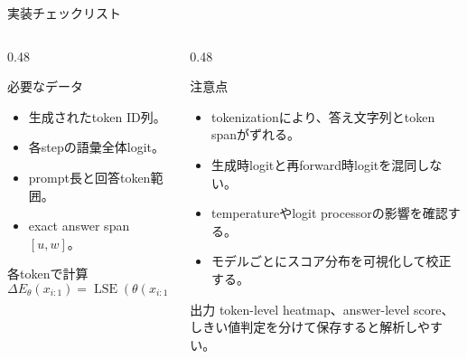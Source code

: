 \documentclass[dvipdfmx,uplatex,unicode,9pt,aspectratio=169]{beamer}
\newcommand{\DeltaE}{\Delta E_{\theta}}
\newcommand{\LSE}{\operatorname{LSE}}
\begin{document}
\begin{frame}{実装チェックリスト}
\begin{columns}[T,onlytextwidth]
\begin{column}{0.48\linewidth}
\begin{block}{必要なデータ}
\begin{itemize}
\item 生成されたtoken ID列。
\item 各stepの語彙全体logit。
\item prompt長と回答token範囲。
\item exact answer span $[u,w]$。
\end{itemize}
\end{block}
\begin{block}{各tokenで計算}
\[
\DeltaE(x_{i:1})
=\LSE(\theta(x_{i:1}))
-\theta(x_{i-1:1})[\mathrm{id}(x_i)].
\]
\end{block}
\end{column}
\begin{column}{0.48\linewidth}
\begin{block}{注意点}
\begin{itemize}
\item tokenizationにより、答え文字列とtoken spanがずれる。
\item 生成時logitと再forward時logitを混同しない。
\item temperatureやlogit processorの影響を確認する。
\item モデルごとにスコア分布を可視化して校正する。
\end{itemize}
\end{block}
\begin{block}{出力}
token-level heatmap、answer-level score、しきい値判定を分けて保存すると解析しやすい。
\end{block}
\end{column}
\end{columns}
\end{frame}
\end{document}
